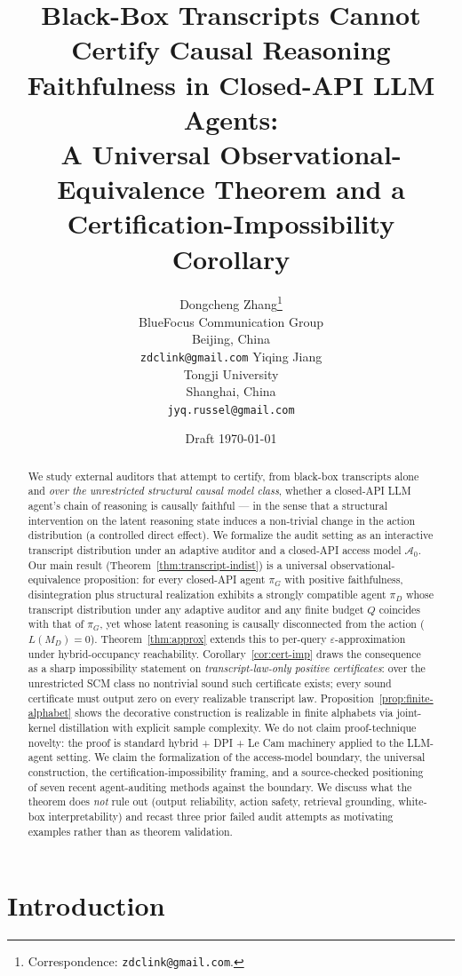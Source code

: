 \documentclass{article}
\title{Black-Box Transcripts Cannot Certify Causal Reasoning Faithfulness in Closed-API LLM Agents:\\
A Universal Observational-Equivalence Theorem and a Certification-Impossibility Corollary}
\author{%
  Dongcheng Zhang\thanks{Correspondence: \texttt{zdclink@gmail.com}.} \\
  BlueFocus Communication Group \\
  Beijing, China \\
  \texttt{zdclink@gmail.com}
  \AND
  Yiqing Jiang \\
  Tongji University \\
  Shanghai, China \\
  \texttt{jyq.russel@gmail.com}
}
\date{Draft \today}
\theoremstyle{plain}
\theoremstyle{definition}
\theoremstyle{remark}
\begin{document}
\maketitle

\begin{abstract}
We study external auditors that attempt to certify, from black-box transcripts
alone and \emph{over the unrestricted structural causal model class}, whether
a closed-API LLM agent's chain of reasoning is causally faithful --- in the
sense that a structural intervention on the latent reasoning state induces
a non-trivial change in the action distribution (a controlled direct effect). We formalize the audit setting as an interactive
transcript distribution under an adaptive auditor and a closed-API access
model $\mathcal{A}_0$. Our main result (Theorem~\ref{thm:transcript-indist})
is a universal observational-equivalence proposition: for every closed-API
agent $\pi_G$ with positive faithfulness, disintegration plus structural
realization exhibits a strongly compatible agent $\pi_D$ whose transcript
distribution under any adaptive auditor and any finite budget $Q$ coincides
with that of $\pi_G$, yet whose latent reasoning is causally disconnected
from the action ($L(M_D) = 0$). Theorem~\ref{thm:approx} extends this to
per-query $\varepsilon$-approximation under hybrid-occupancy reachability.
Corollary~\ref{cor:cert-imp} draws the consequence as a sharp impossibility
statement on \emph{transcript-law-only positive certificates}: over the
unrestricted SCM class no nontrivial sound such certificate exists; every
sound certificate must output zero on every realizable transcript law.
Proposition~\ref{prop:finite-alphabet} shows the decorative construction is
realizable in finite alphabets via joint-kernel distillation with explicit
sample complexity. We do not claim proof-technique novelty: the proof is
standard hybrid + DPI + Le Cam machinery applied to the LLM-agent setting.
We claim the formalization of the access-model boundary, the universal
construction, the certification-impossibility framing, and a source-checked
positioning of seven recent agent-auditing methods against the boundary. We
discuss what the theorem does \emph{not} rule out (output reliability,
action safety, retrieval grounding, white-box interpretability) and recast
three prior failed audit attempts as motivating examples rather than as
theorem validation.
\end{abstract}

\section{Introduction}\label{sec:intro}
\end{document}
